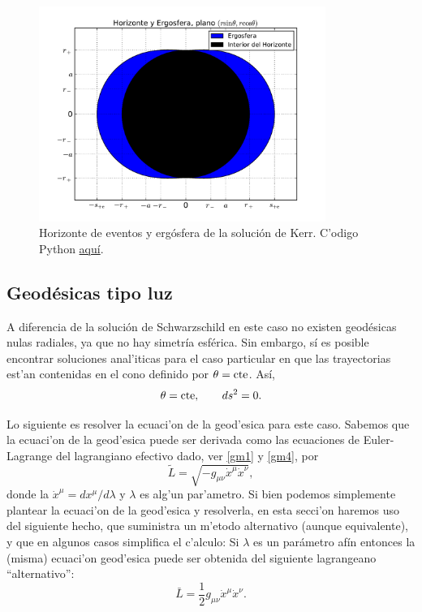 \begin{figure}[H]
 \centering
\includegraphics[height=7cm,angle=0]{fig/fig-superficies-3.pdf}
\caption{Horizonte de eventos y erg\'osfera de la soluci\'on de Kerr. C'odigo Python  \href{https://github.com/gfrubi/GR/blob/master/figuras-editables/fig-superficies-Kerr-01.py}{aqu\'i}.}
\label{fig:surface3}
\end{figure}

\subsection{Geod\'esicas tipo luz}

A diferencia de la soluci\'on de Schwarzschild en este caso no existen geod\'esicas nulas radiales, ya que no hay simetr\'ia esf\'erica. Sin embargo, s\'i es posible encontrar soluciones anal'iticas para el caso particular en que las trayectorias est'an contenidas en el cono definido por $\theta=\rm cte$. As\'i,
\begin{equation}
\theta={\rm cte},\qquad ds^2=0.
\end{equation}

Lo siguiente es resolver la ecuaci'on de la geod'esica para este caso. Sabemos que la ecuaci'on de la geod'esica puede ser derivada como las ecuaciones de Euler-Lagrange del lagrangiano efectivo dado, ver \eqref{gm1} y \eqref{gm4}, por
\begin{equation} \label{lagrange1}
\tilde{L}=\sqrt{-g_{\mu \nu}\dot{x}^{\mu}\dot{x}^{\nu}},
\end{equation}
donde la $\dot{x}^{\mu}=dx^\mu/d\lambda$ y $\lambda$ es alg'un par'ametro. Si bien podemos simplemente plantear la ecuaci'on de la geod'esica y resolverla, en esta secci'on haremos uso del siguiente hecho, que suministra un m'etodo alternativo (aunque equivalente), y que en algunos casos simplifica el c'alculo: Si $\lambda$ es un par\'ametro af\'in entonces la (misma) ecuaci'on geod'esica puede ser obtenida del siguiente lagrangeano ``alternativo'':
\begin{equation} \label{lagrange2}
\bar{L}= \frac{1}{2}g_{\mu \nu}\dot{x}^{\mu}\dot{x}^{\nu}.
\end{equation}
 
